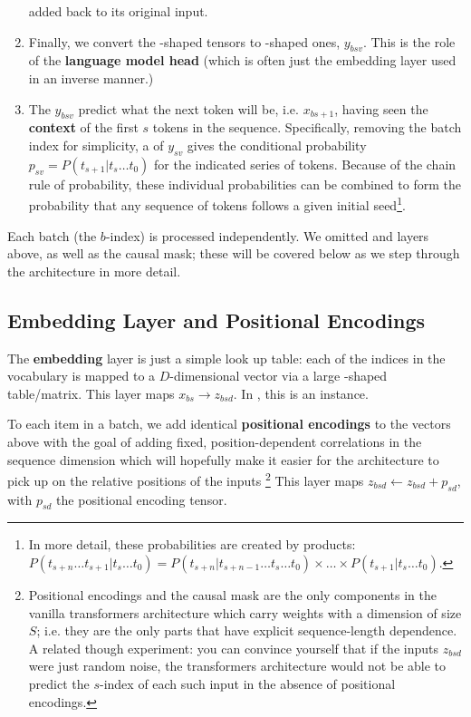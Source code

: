 \documentclass[11pt]{article}
\begin{document}
\begin{enumerate}
              added back to its original input.
	\item Finally, we convert the -shaped
	      tensors to -shaped ones, $ y _{ bsv } $. This is the role of
	      the \textbf{language model head} (which is often just the embedding layer used in an inverse
	      manner.)
	\item  The $ y _{ bsv } $ predict what the next token will be, i.e. $ x _{ bs+1 } $, having seen the \textbf{context}
          of the first $ s $ tokens in the sequence. Specifically, removing the batch index for
          simplicity, a   of $ y _{ sv } $ gives the conditional probability $ p _{ sv
          } = P(t _{ s+1 }|t _{ s } \ldots t _ {0}) $ for the indicated series of tokens. Because of
          the chain rule of probability, these individual probabilities can be combined to form the
          probability that any sequence of tokens follows a given initial seed\footnote{In more
          detail, these probabilities are created by products: $ P(t _{ s+n } \ldots t _{ s+1}| t _{
          s } \ldots  t _{ 0 }) =P(t _{ s+n }| t _{ s+n - 1} \ldots  t _{ s } \ldots  t _{ 0}) \times
      \ldots  \times P(t _{ s+1 } | t _{ s } \ldots  t _{ 0 }) $.}.
\end{enumerate}


Each batch (the $ b $-index) is processed independently. We omitted  and
 layers above, as well as the causal mask; these will be covered below as we step
through the architecture in more detail.



\subsection{Embedding Layer and Positional Encodings \label{subsubsec_embedding_and_pe} }

The \textbf{embedding} layer is just a simple look up table: each of the  indices
in the vocabulary is mapped to a $ D $-dimensional vector via a large -shaped
table/matrix. This layer maps $ x _{ bs } \longrightarrow z _{ bsd } $. In , this is
an  instance.

To each item in a batch, we add identical \textbf{positional encodings} to the vectors above with
the goal of adding fixed, position-dependent correlations in the sequence dimension which will
hopefully make it easier for the architecture to pick up on the relative positions of the inputs
\footnote{Positional encodings and the causal mask are the only components in the vanilla transformers
	architecture which carry weights with a dimension of size $ S $; i.e. they are the only parts that
	have explicit sequence-length dependence. A related though experiment: you can convince yourself
	that if the inputs $ z_{ bsd } $
	were just random noise, the transformers architecture would not be able to predict
	the $ s $-index of each such input in the absence of positional encodings. } This layer maps $ z _{
			bsd} \leftarrow z _{ bsd } + p _{ sd } $, with $ p _{ sd } $ the positional encoding tensor.
\end{document}
